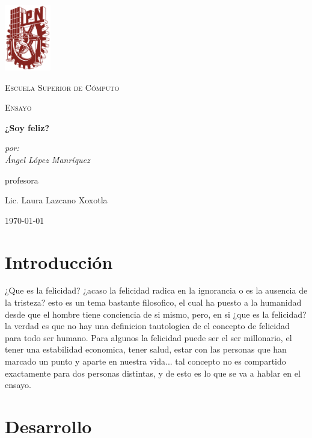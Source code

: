 \documentclass[12pt,letterpaper]{article}
\begin{document}
\begin{titlepage}
	\centering
	\includegraphics[width=0.15\textwidth]{ipn.PNG}\par\vspace{1cm}
	{\scshape\LARGE Escuela Superior de Cómputo \par}
	\vspace{1cm}
	{\scshape\Large Ensayo \par}
	\vspace{1.5cm}
	{\huge\bfseries ¿Soy feliz? \par}
	\vspace{2cm}
	{\Large\itshape por: \\ Ángel López Manríquez \\ \par}
	\vfill
	profesora\par
	Lic. Laura Lazcano Xoxotla 

	\vfill

	{\large \today\par}
\end{titlepage}

\section{Introducción}

	¿Que es la felicidad? ¿acaso la felicidad radica en la ignorancia o es la ausencia de la tristeza? esto es un tema bastante filosofico, el cual  ha puesto a la humanidad desde que el hombre tiene conciencia de si mismo, pero, en si ¿que es la felicidad? la verdad es que no hay una definicion tautologica de el concepto de felicidad para todo ser humano. Para algunos la felicidad puede ser el ser millonario, el tener una estabilidad economica, tener salud, estar con las personas que han marcado un punto y aparte en nuestra vida... tal concepto no es compartido exactamente para dos personas distintas, y de esto es lo que se va a hablar en el ensayo.

\section{Desarrollo}
	
\end{document}
